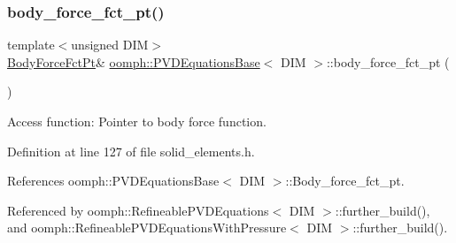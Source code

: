 \mbox{\label{classoomph_1_1PVDEquationsBase_a4086278ead7513f26bec549f5eaf4e15}} 
\subsubsection{\texorpdfstring{body\+\_\+force\+\_\+fct\+\_\+pt()}{body\_force\_fct\_pt()}\hspace{0.1cm}{\footnotesize\ttfamily [1/2]}}
{\footnotesize\ttfamily template$<$unsigned D\+IM$>$ \\
\hyperlink{classoomph_1_1PVDEquationsBase_aa0d7dc7279aff03dfcc3ad35bb6653be}{Body\+Force\+Fct\+Pt}\& \hyperlink{classoomph_1_1PVDEquationsBase}{oomph\+::\+P\+V\+D\+Equations\+Base}$<$ D\+IM $>$\+::body\+\_\+force\+\_\+fct\+\_\+pt (\begin{DoxyParamCaption}{ }\end{DoxyParamCaption})\hspace{0.3cm}{\ttfamily [inline]}}



Access function\+: Pointer to body force function. 



Definition at line 127 of file solid\+\_\+elements.\+h.



References oomph\+::\+P\+V\+D\+Equations\+Base$<$ D\+I\+M $>$\+::\+Body\+\_\+force\+\_\+fct\+\_\+pt.



Referenced by oomph\+::\+Refineable\+P\+V\+D\+Equations$<$ D\+I\+M $>$\+::further\+\_\+build(), and oomph\+::\+Refineable\+P\+V\+D\+Equations\+With\+Pressure$<$ D\+I\+M $>$\+::further\+\_\+build().

\mbox{\label{classoomph_1_1PVDEquationsBase_a8692a8eccccf96efefa98a2ed3e92446}} 
